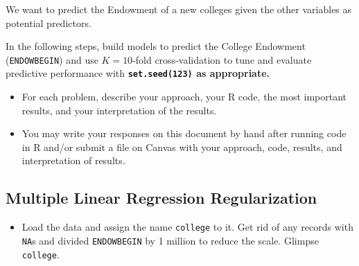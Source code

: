 \documentclass[
  letterpaper,
  DIV=11,
  numbers=noendperiod]{scrartcl}
\newenvironment{Shaded}{\begin{snugshade}}{\end{snugshade}}
\newcommand{\CommentTok}[1]{\textcolor[rgb]{0.37,0.37,0.37}{#1}}
\newcommand{\DecValTok}[1]{\textcolor[rgb]{0.68,0.00,0.00}{#1}}
\newcommand{\FunctionTok}[1]{\textcolor[rgb]{0.28,0.35,0.67}{#1}}
\newcommand{\NormalTok}[1]{\textcolor[rgb]{0.00,0.23,0.31}{#1}}
\newcommand{\OtherTok}[1]{\textcolor[rgb]{0.00,0.23,0.31}{#1}}
\newcommand{\SpecialCharTok}[1]{\textcolor[rgb]{0.37,0.37,0.37}{#1}}
\newcommand{\StringTok}[1]{\textcolor[rgb]{0.13,0.47,0.30}{#1}}
\providecommand{\tightlist}{%
  \setlength{\itemsep}{0pt}\setlength{\parskip}{0pt}}\usepackage{longtable,booktabs,array}
\begin{document}
We want to predict the Endowment of a new colleges given the other
variables as potential predictors.

In the following steps, build models to predict the College Endowment
(\texttt{ENDOWBEGIN}) and use \(K=10\)-fold cross-validation to tune and
evaluate predictive performance with \textbf{\texttt{set.seed(123)} as
appropriate.}

\begin{itemize}
\item
  For each problem, describe your approach, your R code, the most
  important results, and your interpretation of the results.
\item
  You may write your responses on this document by hand after running
  code in R and/or submit a file on Canvas with your approach, code,
  results, and interpretation of results.
\end{itemize}

\subsection{Multiple Linear Regression
Regularization}\label{multiple-linear-regression-regularization}

\begin{itemize}
\tightlist
\item
  Load the data and assign the name \texttt{college} to it. Get rid of
  any records with \texttt{NA}s and divided \texttt{ENDOWBEGIN} by 1
  million to reduce the scale. Glimpse \texttt{college}.
\end{itemize}

\begin{Shaded}
\end{Shaded}
\end{document}

